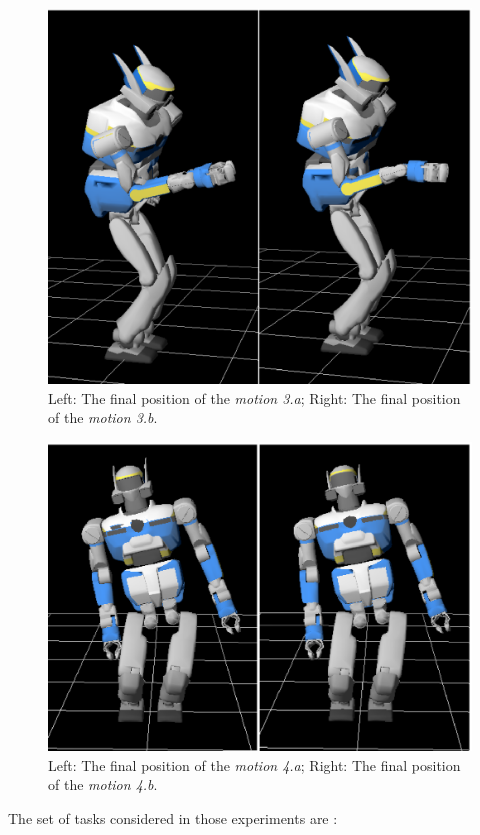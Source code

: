 \documentclass[journal]{IEEEtran}
\begin{document}
\begin{figure}[t]
\begin{center}
\includegraphics[width=0.55\linewidth]{img/spotDiff2bis.ps}
\end{center}
\caption{Left: The final position of the \emph{motion 3.a}; Right: The final position of the \emph{motion 3.b}.}
\label{fig:spotDiff2}
\vspace{-3pt}
\end{figure}
\begin{figure}[t]
\begin{center}
\includegraphics[width=0.66\linewidth]{img/spotDiff3.ps}
\end{center}
\caption{Left: The final position of the \emph{motion 4.a}; Right: The final position of the \emph{motion 4.b}.}
\label{fig:spotDiff3}
\end{figure}

The set of tasks considered in those experiments are :
\end{document}
